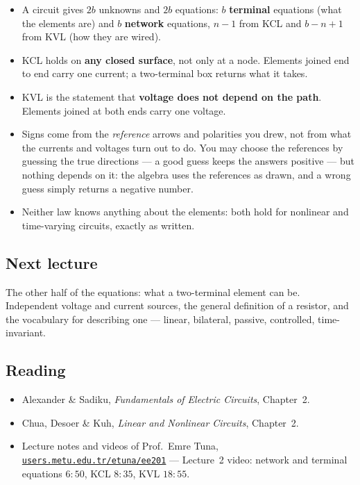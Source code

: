 \documentclass[11pt,a4paper]{article}
\begin{document}
\begin{itemize}
  \item A circuit gives $2b$ unknowns and $2b$ equations: $b$ \textbf{terminal} equations
        (what the elements are) and $b$ \textbf{network} equations,
        $n-1$ from KCL and $b-n+1$ from KVL (how they are wired).
  \item KCL holds on \textbf{any closed surface}, not only at a node. Elements joined end
        to end carry one current; a two-terminal box returns what it takes.
  \item KVL is the statement that \textbf{voltage does not depend on the path}. Elements
        joined at both ends carry one voltage.
  \item Signs come from the \emph{reference} arrows and polarities you drew, not from what
        the currents and voltages turn out to do. You may choose the references by
        guessing the true directions --- a good guess keeps the answers positive --- but
        nothing depends on it: the algebra uses the references as drawn, and a wrong guess
        simply returns a negative number.
  \item Neither law knows anything about the elements: both hold for nonlinear and
        time-varying circuits, exactly as written.
\end{itemize}

\subsection*{Next lecture}
The other half of the equations: what a two-terminal element can be. Independent voltage
and current sources, the general definition of a resistor, and the vocabulary for
describing one --- linear, bilateral, passive, controlled, time-invariant.

\subsection*{Reading}
\begin{itemize}
  \item Alexander \& Sadiku, \emph{Fundamentals of Electric Circuits}, Chapter~2.
  \item Chua, Desoer \& Kuh, \emph{Linear and Nonlinear Circuits}, Chapter~2.
  \item Lecture notes and videos of Prof.\ Emre Tuna,
        \href{https://users.metu.edu.tr/etuna/ee201/}{\texttt{users.metu.edu.tr/etuna/ee201}}
        --- Lecture~2 video: network and terminal equations $6{:}50$, KCL $8{:}35$,
        KVL $18{:}55$.
\end{itemize}
\end{document}
